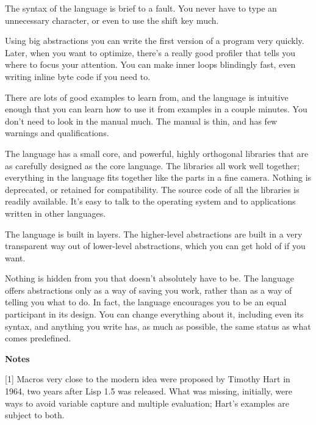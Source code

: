 The syntax of the language is brief to a
                  fault. You never have to type an unnecessary character, or
                  even to use the shift key much.

Using big
                  abstractions you can write the first version of a program very
                  quickly. Later, when you want to optimize, there's a really
                  good profiler that tells you where to focus your attention.
                  You can make inner loops blindingly fast, even writing inline
                  byte code if you need to.

There are lots of good
                  examples to learn from, and the language is intuitive enough
                  that you can learn how to use it from examples in a couple
                  minutes. You don't need to look in the manual much. The manual
                  is thin, and has few warnings and qualifications.

The
                  language has a small core, and powerful, highly orthogonal
                  libraries that are as carefully designed as the core language.
                  The libraries all work well together; everything in the
                  language fits together like the parts in a fine camera.
                  Nothing is deprecated, or retained for compatibility. The
                  source code of all the libraries is readily available. It's
                  easy to talk to the operating system and to applications
                  written in other languages.

The language is built
                  in layers. The higher-level abstractions are built in a very
                  transparent way out of lower-level abstractions, which you can
                  get hold of if you want.

Nothing is hidden from you
                  that doesn't absolutely have to be. The language offers
                  abstractions only as a way of saving you work, rather than as
                  a way of telling you what to do. In fact, the language
                  encourages you to be an equal participant in its design. You
                  can change everything about it, including even its syntax, and
                  anything you write has, as much as possible, the same status
                  as what comes predefined.



\textbf{Notes}

[1] Macros very close to the modern idea were
                  proposed by Timothy Hart in 1964, two years after Lisp 1.5 was
                  released. What was missing, initially, were ways to avoid
                  variable capture and multiple evaluation; Hart's examples are
                  subject to both.

